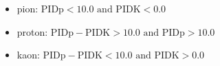 \begin{itemize}
\item pion: $\text{PIDp} < 10.0 \text{ and } \text{PIDK} < 0.0$
\item proton: $\text{PIDp} - \text{PIDK} > 10.0 \text{ and } \text{PIDp} > 10.0$
\item kaon: $\text{PIDp} - \text{PIDK} < 10.0 \text{ and } \text{PIDK} > 0.0$
\end{itemize}